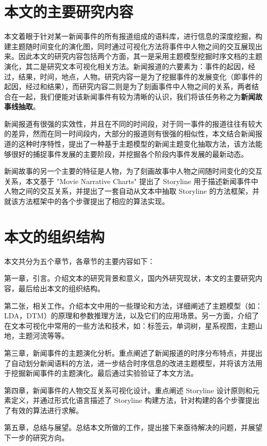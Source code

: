 \section{本文的主要研究内容}
本文着眼于针对某一新闻事件的所有报道组成的语料库，进行信息的深度挖掘，构建主题随时间变化的演化图，同时通过可视化方法将事件中人物之间的交互展现出来。因此本文的研究内容包括两个方面，其一是采用主题模型挖掘时序文档的主题演化，其二是研究文本可视化相关方法。新闻报道的六要素为：事件的起因，经过，结果，时间，地点，人物。研究内容一是为了挖掘事件的发展变化（即事件的起因，经过和结果），而研究内容二则是为了刻画事件中人物之间的关系，两者结合在一起，我们便能对该新闻事件有较为清晰的认识，我们将该任务称之为\textbf{新闻故事线抽取}。

新闻报道有很强的实效性，并且在不同的时间段，对于同一事件的报道往往有较大的差异，然而在同一时间段内，大部分的报道则有很强的相似性，本文结合新闻报道的这种时序特性，提出了一种基于主题模型的新闻主题变化抽取方法，该方法能够很好的捕捉事件发展的主要阶段，并挖掘各个阶段内事件发展的最新动态。

新闻故事的另一个主要的特征是人物，为了刻画故事中人物之间随时间变化的交互关系，本文基于 "Movie Narrative Charts" \cite{xkcd657} 提出了 Storyline 用于描述新闻事件中人物之间的交互关系，并提出了一套自动从文本中抽取 Storyline 的方法框架，并就该方法框架中的各个步骤提出了相应的算法实现。

\section{本文的组织结构}
本文共分为五个章节，各章节的主要内容如下：

第一章，引言。介绍文本的研究背景和意义，国内外研究现状，本文的主要研究内容，最后给出本文的组织结构。

第二张，相关工作。介绍本文中用的一些理论和方法，详细阐述了主题模型（如：LDA，DTM）的原理和参数推理方法，以及它们的应用场景。另一方面，介绍了在文本可视化中常用的一些方法和技术，如：标签云，单词树，星系视图，主题山地，主题河流等等。

第三章，新闻事件的主题演化分析。重点阐述了新闻报道的时序分布特点，并提出了自动划分新闻语料的方法，进一步结合时序信息的改进主题模型，并将该方法用于挖掘新闻事件的主题演化。最后通过实验验证了本文方法。

第四章，新闻事件的人物交互关系可视化设计。重点阐述 Storyline 设计原则和元素定义，并通过形式化语言描述了 Storyline 构建方法，针对构建的各个步骤提出了有效的算法进行求解。

第五章，总结与展望。总结本文所做的工作，提出接下来亟待解决的问题，并展望下一步的研究方向。

